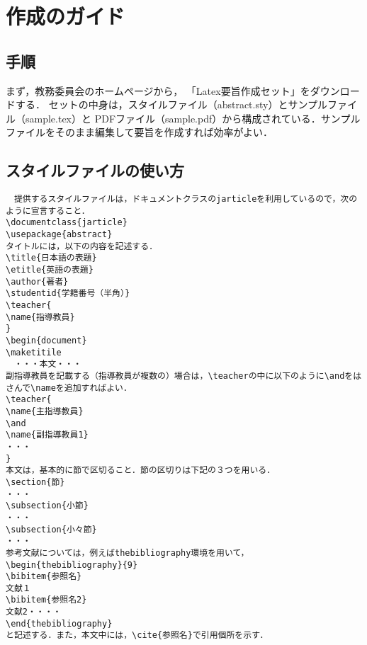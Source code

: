 \documentclass[main]{subfiles}
\begin{document}
\section{作成のガイド}
\subsection{手順}
まず，教務委員会のホームページから，
「Latex要旨作成セット」をダウンロードする．
セットの中身は，スタイルファイル（abstract.sty）とサンプルファイル（sample.tex）と
PDFファイル（sample.pdf）から構成されている．サンプルファイルをそのまま編集して要旨を作成すれば効率がよい．
\subsection{スタイルファイルの使い方}
\begin{verbatim}
　提供するスタイルファイルは，ドキュメントクラスのjarticleを利用しているので，次のように宣言すること．
\documentclass{jarticle}
\usepackage{abstract}
タイトルには，以下の内容を記述する．
\title{日本語の表題}
\etitle{英語の表題}
\author{著者}
\studentid{学籍番号（半角）}
\teacher{
\name{指導教員}
}
\begin{document}
\maketitile
　・・・本文・・・
副指導教員を記載する（指導教員が複数の）場合は，\teacherの中に以下のように\andをはさんで\nameを追加すればよい．
\teacher{
\name{主指導教員}
\and
\name{副指導教員1}
・・・
}
本文は，基本的に節で区切ること．節の区切りは下記の３つを用いる．
\section{節}
・・・
\subsection{小節}
・・・
\subsection{小々節}
・・・
参考文献については，例えばthebibliography環境を用いて，
\begin{thebibliography}{9}
\bibitem{参照名}
文献１
\bibitem{参照名2}
文献2・・・・
\end{thebibliography}
と記述する．また，本文中には，\cite{参照名}で引用個所を示す．
\end{verbatim}
\end{document}
